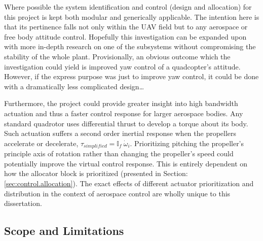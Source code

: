 \par
Where possible the system identification and control (design and allocation) for this project is kept both modular and generically applicable. The intention here is that its pertinence falls not only within the UAV field but to any aerospace or free body attitude control. Hopefully this investigation can be expanded upon with more in-depth research on one of the subsystems without compromising the stability of the whole plant. Provisionally, an obvious outcome which the investigation could yield is improved yaw control of a quadcopter's attitude. However, if the express purpose was just to improve yaw control, it could be done with a dramatically less complicated design\ldots
\par
Furthermore, the project could provide greater insight into high bandwidth actuation and thus a faster control response for larger aerospace bodies. Any standard quadrotor uses differential thrust to develop a torque about its body. Such actuation suffers a second order inertial response when the propellers accelerate or decelerate, $\tau_{simplified}=\mathbb{I}_f~\dot{\omega}_{i}$. Prioritizing pitching the propeller's principle axis of rotation rather than changing the propeller's speed could potentially improve the virtual control response. This is entirely dependent on how the allocator block is prioritized (presented in Section:\ref{sec:control.allocation}). The exact effects of different actuator prioritization and distribution in the context of aerospace control are wholly unique to this dissertation.
\subsection{Scope and Limitations}
\label{subsec:intro.foreword.scopeandlim}
